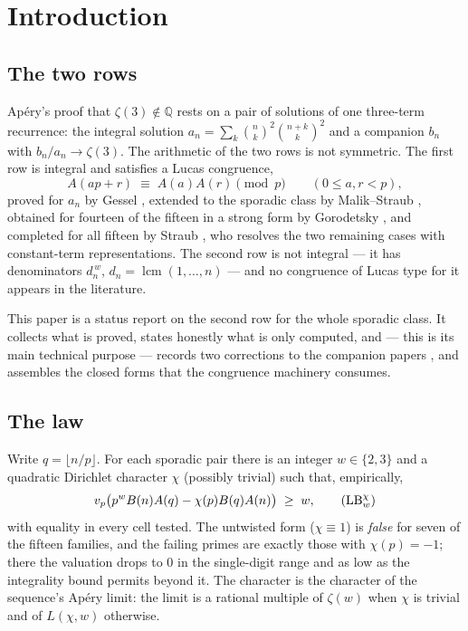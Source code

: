 \documentclass[11pt,reqno]{amsart}
\theoremstyle{plain}
\theoremstyle{definition}
\theoremstyle{remark}
\newcommand{\Q}{\mathbb{Q}}
\newcommand{\vp}{v_p}
\newcommand{\bin}[2]{\binom{#1}{#2}}
\DeclareMathOperator{\lcm}{lcm}
\numberwithin{equation}{section}
\begin{document}
\maketitle

\section{Introduction}

\subsection{The two rows}
Ap\'ery's proof that $\zeta(3)\notin\Q$ rests on a pair of solutions of one three-term
recurrence: the integral solution $a_n=\sum_k\bin nk^2\bin{n+k}k^2$ and a companion $b_n$
with $b_n/a_n\to\zeta(3)$. The arithmetic of the two rows is not symmetric. The first row
is integral and satisfies a Lucas congruence,
\begin{equation}\label{eq:Arow}
  A(ap+r)\;\equiv\;A(a)A(r)\pmod p\qquad(0\le a,r<p),
\end{equation}
proved for $a_n$ by Gessel \cite{Gessel1982}, extended to the sporadic class by
Malik--Straub \cite{MalikStraub}, obtained for fourteen of the fifteen in a strong form by
Gorodetsky \cite{Gorodetsky}, and completed for all fifteen by Straub \cite{Straub2301},
who resolves the two remaining cases with constant-term representations. The second row is not integral --- it has denominators
$d_n^{\,w}$, $d_n=\lcm(1,\dots,n)$ --- and no congruence of Lucas type for it appears in
the literature.

This paper is a status report on the second row for the whole sporadic class. It collects
what is proved, states honestly what is only computed, and --- this is its main technical
purpose --- records two corrections to the companion papers
\cite{CompanionLucas2nd,CompanionLucasMin}, and assembles the closed forms that the
congruence machinery consumes.

\subsection{The law}
Write $q=\lfloor n/p\rfloor$. For each sporadic pair there is an integer $w\in\{2,3\}$ and
a quadratic Dirichlet character $\chi$ (possibly trivial) such that, empirically,
\begin{equation}\label{eq:master}
  \vp\bigl(p^{w}B(n)A(q)-\chi(p)B(q)A(n)\bigr)\;\ge\;w ,
  \tag{$\mathrm{LB}_w^\chi$}
\end{equation}
with equality in every cell tested. The untwisted form ($\chi\equiv1$) is
\emph{false} for seven of the fifteen families, and the failing primes are exactly those
with $\chi(p)=-1$; there the valuation drops to $0$ in the single-digit range and as low as
the integrality bound permits beyond it. The character is the character of the sequence's
Ap\'ery limit: the limit is a rational multiple of $\zeta(w)$ when $\chi$ is trivial and of
$L(\chi,w)$ otherwise.
\end{document}
